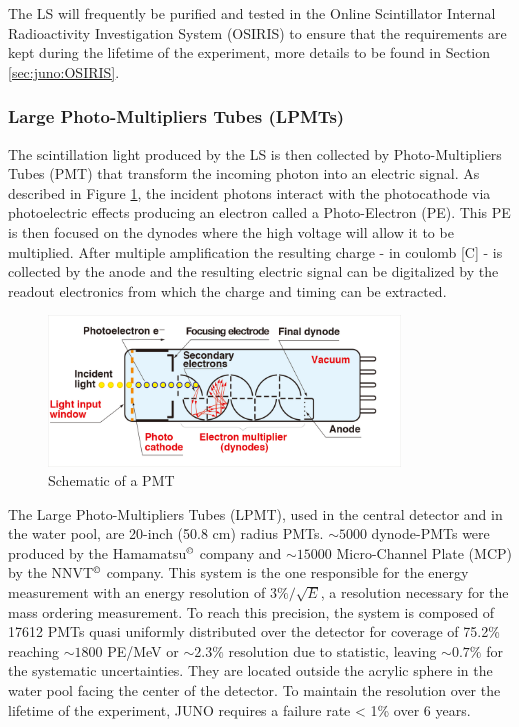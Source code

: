 \documentclass[../main.tex]{subfiles}
\begin{document}
The LS will frequently be purified and tested in the Online Scintillator Internal Radioactivity Investigation System (OSIRIS) \cite{juno_collaboration_design_2021} to ensure that the requirements are kept during the lifetime of the experiment, more details to be found in Section \ref{sec:juno:OSIRIS}.

\subsubsection{Large Photo-Multipliers Tubes (LPMTs)}
\label{sec:juno:LPMT}

The scintillation light produced by the LS is then collected by Photo-Multipliers Tubes (PMT) that transform the incoming photon into an electric signal. As described in Figure \ref{fig:juno:pmt-schem}, the incident photons interact with the photocathode via photoelectric effects producing an electron called a Photo-Electron (PE). This PE is then focused on the dynodes where the high voltage will allow it to be multiplied. After multiple amplification the resulting charge - in coulomb [C] - is collected by the anode and the resulting electric signal can be digitalized by the readout electronics from which the charge and timing can be extracted.

\begin{figure}[ht]
  \centering
  \includegraphics[height=4cm]{images/juno/pmt_schematic.png}
  \caption{Schematic of a PMT}
  \label{fig:juno:pmt-schem}
\end{figure}

The Large Photo-Multipliers Tubes (LPMT), used in the central detector and in the water pool, are 20-inch (50.8 cm) radius PMTs. $\sim 5000$ dynode-PMTs \cite{noauthor_photomultiplier_nodate} were produced by the Hamamatsu$^{\copyright}$ company and $\sim 15000$ Micro-Channel Plate (MCP) \cite{abusleme_mass_2022} by the NNVT$^{\copyright}$ company. This system is the one responsible for the energy measurement with an energy resolution of $3\%/\sqrt{E}$, a resolution necessary for the mass ordering measurement. To reach this precision, the system is composed of 17612 PMTs quasi uniformly distributed over the detector for coverage of 75.2\% reaching $\sim 1800$ PE/MeV or $\sim 2.3 \%$ resolution due to statistic, leaving $\sim 0.7\%$ for the systematic uncertainties. They are located outside the acrylic sphere in the water pool facing the center of the detector.
To maintain the resolution over the lifetime of the experiment, JUNO requires a failure rate < 1\% over 6 years.
\end{document}
